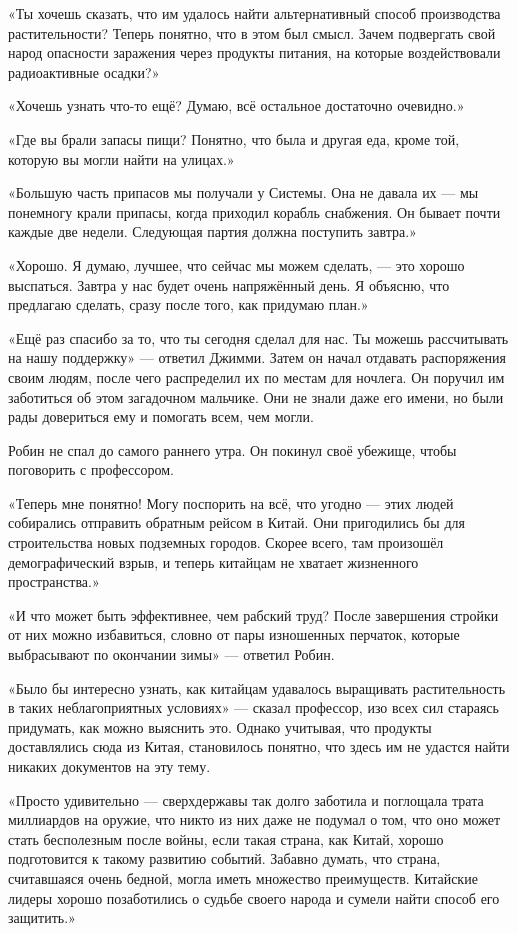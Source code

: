 \documentclass[a5paper, 9pt,
final, openany, twoside=true]{memoir}
\begin{document}
«Ты хочешь сказать, что им удалось найти альтернативный способ производства растительности? Теперь понятно, что в этом был смысл. Зачем подвергать свой народ опасности заражения через продукты питания, на которые воздействовали радиоактивные осадки?»

«Хочешь узнать что-то ещё? Думаю, всё остальное достаточно очевидно.»

«Где вы брали запасы пищи? Понятно, что была и другая еда, кроме той, которую вы могли найти на улицах.»

«Большую часть припасов мы получали у Системы. Она не давала их — мы понемногу крали припасы, когда приходил корабль снабжения. Он бывает почти каждые две недели. Следующая партия должна поступить завтра.»

«Хорошо. Я думаю, лучшее, что сейчас мы можем сделать, — это хорошо выспаться. Завтра у нас будет очень напряжённый день. Я объясню, что предлагаю сделать, сразу после того, как придумаю план.»

«Ещё раз спасибо за то, что ты сегодня сделал для нас. Ты можешь рассчитывать на нашу поддержку» — ответил Джимми. Затем он начал отдавать распоряжения своим людям, после чего распределил их по местам для ночлега. Он поручил им заботиться об этом загадочном мальчике. Они не знали даже его имени, но были рады довериться ему и помогать всем, чем могли.\bigskip

Робин не спал до самого раннего утра. Он покинул своё убежище, чтобы поговорить с профессором.

«Теперь мне понятно! Могу поспорить на всё, что угодно — этих людей собирались отправить обратным рейсом в Китай. Они пригодились бы для строительства новых подземных городов. Скорее всего, там произошёл демографический взрыв, и теперь китайцам не хватает жизненного пространства.»

«И что может быть эффективнее, чем рабский труд? После завершения стройки от них можно избавиться, словно от пары изношенных перчаток, которые выбрасывают по окончании зимы» — ответил Робин.

«Было бы интересно узнать, как китайцам удавалось выращивать растительность в таких неблагоприятных условиях» — сказал профессор, изо всех сил стараясь придумать, как можно выяснить это. Однако учитывая, что продукты доставлялись сюда из Китая, становилось понятно, что здесь им не удастся найти никаких документов на эту тему.

«Просто удивительно — сверхдержавы так долго заботила и поглощала трата миллиардов на оружие, что никто из них даже не подумал о том, что оно может стать бесполезным после войны, если такая страна, как Китай, хорошо подготовится к такому развитию событий. Забавно думать, что страна, считавшаяся очень бедной, могла иметь множество преимуществ. Китайские лидеры хорошо позаботились о судьбе своего народа и сумели найти способ его защитить.»
\end{document}
